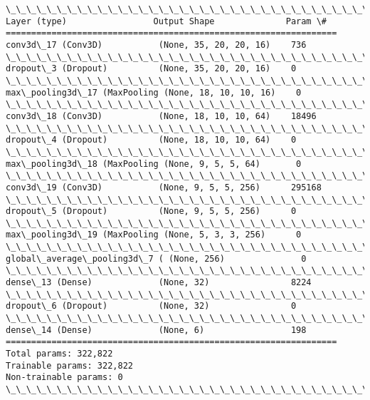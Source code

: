 \documentclass[11pt]{article}
\begin{document}
    \begin{Verbatim}[commandchars=\\\{\}]
\_\_\_\_\_\_\_\_\_\_\_\_\_\_\_\_\_\_\_\_\_\_\_\_\_\_\_\_\_\_\_\_\_\_\_\_\_\_\_\_\_\_\_\_\_\_\_\_\_\_\_\_\_\_\_\_\_\_\_\_\_\_\_\_\_
Layer (type)                 Output Shape              Param \#   
=================================================================
conv3d\_17 (Conv3D)           (None, 35, 20, 20, 16)    736       
\_\_\_\_\_\_\_\_\_\_\_\_\_\_\_\_\_\_\_\_\_\_\_\_\_\_\_\_\_\_\_\_\_\_\_\_\_\_\_\_\_\_\_\_\_\_\_\_\_\_\_\_\_\_\_\_\_\_\_\_\_\_\_\_\_
dropout\_3 (Dropout)          (None, 35, 20, 20, 16)    0         
\_\_\_\_\_\_\_\_\_\_\_\_\_\_\_\_\_\_\_\_\_\_\_\_\_\_\_\_\_\_\_\_\_\_\_\_\_\_\_\_\_\_\_\_\_\_\_\_\_\_\_\_\_\_\_\_\_\_\_\_\_\_\_\_\_
max\_pooling3d\_17 (MaxPooling (None, 18, 10, 10, 16)    0         
\_\_\_\_\_\_\_\_\_\_\_\_\_\_\_\_\_\_\_\_\_\_\_\_\_\_\_\_\_\_\_\_\_\_\_\_\_\_\_\_\_\_\_\_\_\_\_\_\_\_\_\_\_\_\_\_\_\_\_\_\_\_\_\_\_
conv3d\_18 (Conv3D)           (None, 18, 10, 10, 64)    18496     
\_\_\_\_\_\_\_\_\_\_\_\_\_\_\_\_\_\_\_\_\_\_\_\_\_\_\_\_\_\_\_\_\_\_\_\_\_\_\_\_\_\_\_\_\_\_\_\_\_\_\_\_\_\_\_\_\_\_\_\_\_\_\_\_\_
dropout\_4 (Dropout)          (None, 18, 10, 10, 64)    0         
\_\_\_\_\_\_\_\_\_\_\_\_\_\_\_\_\_\_\_\_\_\_\_\_\_\_\_\_\_\_\_\_\_\_\_\_\_\_\_\_\_\_\_\_\_\_\_\_\_\_\_\_\_\_\_\_\_\_\_\_\_\_\_\_\_
max\_pooling3d\_18 (MaxPooling (None, 9, 5, 5, 64)       0         
\_\_\_\_\_\_\_\_\_\_\_\_\_\_\_\_\_\_\_\_\_\_\_\_\_\_\_\_\_\_\_\_\_\_\_\_\_\_\_\_\_\_\_\_\_\_\_\_\_\_\_\_\_\_\_\_\_\_\_\_\_\_\_\_\_
conv3d\_19 (Conv3D)           (None, 9, 5, 5, 256)      295168    
\_\_\_\_\_\_\_\_\_\_\_\_\_\_\_\_\_\_\_\_\_\_\_\_\_\_\_\_\_\_\_\_\_\_\_\_\_\_\_\_\_\_\_\_\_\_\_\_\_\_\_\_\_\_\_\_\_\_\_\_\_\_\_\_\_
dropout\_5 (Dropout)          (None, 9, 5, 5, 256)      0         
\_\_\_\_\_\_\_\_\_\_\_\_\_\_\_\_\_\_\_\_\_\_\_\_\_\_\_\_\_\_\_\_\_\_\_\_\_\_\_\_\_\_\_\_\_\_\_\_\_\_\_\_\_\_\_\_\_\_\_\_\_\_\_\_\_
max\_pooling3d\_19 (MaxPooling (None, 5, 3, 3, 256)      0         
\_\_\_\_\_\_\_\_\_\_\_\_\_\_\_\_\_\_\_\_\_\_\_\_\_\_\_\_\_\_\_\_\_\_\_\_\_\_\_\_\_\_\_\_\_\_\_\_\_\_\_\_\_\_\_\_\_\_\_\_\_\_\_\_\_
global\_average\_pooling3d\_7 ( (None, 256)               0         
\_\_\_\_\_\_\_\_\_\_\_\_\_\_\_\_\_\_\_\_\_\_\_\_\_\_\_\_\_\_\_\_\_\_\_\_\_\_\_\_\_\_\_\_\_\_\_\_\_\_\_\_\_\_\_\_\_\_\_\_\_\_\_\_\_
dense\_13 (Dense)             (None, 32)                8224      
\_\_\_\_\_\_\_\_\_\_\_\_\_\_\_\_\_\_\_\_\_\_\_\_\_\_\_\_\_\_\_\_\_\_\_\_\_\_\_\_\_\_\_\_\_\_\_\_\_\_\_\_\_\_\_\_\_\_\_\_\_\_\_\_\_
dropout\_6 (Dropout)          (None, 32)                0         
\_\_\_\_\_\_\_\_\_\_\_\_\_\_\_\_\_\_\_\_\_\_\_\_\_\_\_\_\_\_\_\_\_\_\_\_\_\_\_\_\_\_\_\_\_\_\_\_\_\_\_\_\_\_\_\_\_\_\_\_\_\_\_\_\_
dense\_14 (Dense)             (None, 6)                 198       
=================================================================
Total params: 322,822
Trainable params: 322,822
Non-trainable params: 0
\_\_\_\_\_\_\_\_\_\_\_\_\_\_\_\_\_\_\_\_\_\_\_\_\_\_\_\_\_\_\_\_\_\_\_\_\_\_\_\_\_\_\_\_\_\_\_\_\_\_\_\_\_\_\_\_\_\_\_\_\_\_\_\_\_

    \end{Verbatim}
\end{document}
